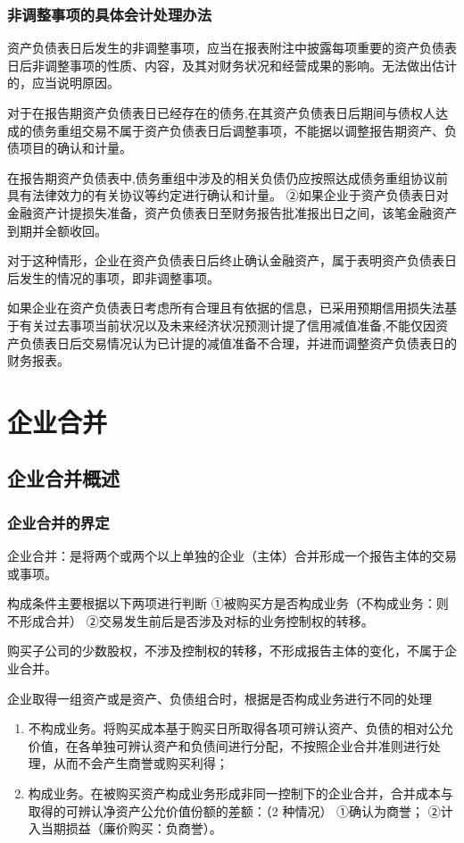\documentclass[UTF8,12pt]{ctexart}
\numberwithin{equation}{section} %
\numberwithin{figure}{section}
\numberwithin{table}{section}
\begin{document}
	
	\subsubsection{非调整事项的具体会计处理办法}
	资产负债表日后发生的非调整事项，应当在报表附注中披露每项重要的资产负债表日后非调整事项的性质、内容，及其对财务状况和经营成果的影响。无法做出估计的，应当说明原因。
	
	对于在报告期资产负债表日已经存在的债务,在其资产负债表日后期间与债权人达成的债务重组交易不属于资产负债表日后调整事项，不能据以调整报告期资产、负债项目的确认和计量。
	
	在报告期资产负债表中,债务重组中涉及的相关负债仍应按照达成债务重组协议前具有法律效力的有关协议等约定进行确认和计量。
	②如果企业于资产负债表日对金融资产计提损失准备，资产负债表日至财务报告批准报出日之间，该笔金融资产到期并全额收回。
	
	对于这种情形，企业在资产负债表日后终止确认金融资产，属于表明资产负债表日后发生的情况的事项，即非调整事项。
	
	如果企业在资产负债表日考虑所有合理且有依据的信息，已采用预期信用损失法基于有关过去事项当前状况以及未来经济状况预测计提了信用减值准备,不能仅因资产负债表日后交易情况认为已计提的减值准备不合理，并进而调整资产负债表日的财务报表。
	\newpage
	
	\section{企业合并}
	\subsection{企业合并概述}
	\subsubsection{企业合并的界定}
	企业合并：是将两个或两个以上单独的企业（主体）合并形成一个报告主体的交易或事项。
	
	构成条件主要根据以下两项进行判断
	①被购买方是否构成业务（不构成业务：则不形成合并）
	②交易发生前后是否涉及对标的业务控制权的转移。
	
	购买子公司的少数股权，不涉及控制权的转移，不形成报告主体的变化，不属于企业合并。
	
	企业取得一组资产或是资产、负债组合时，根据是否构成业务进行不同的处理
	\begin{enumerate}
		\item 不构成业务。将购买成本基于购买日所取得各项可辨认资产、负债的相对公允价值，在各单独可辨认资产和负债间进行分配，不按照企业合并准则进行处理，从而不会产生商誉或购买利得；
		
		\item 构成业务。在被购买资产构成业务形成非同一控制下的企业合并，合并成本与取得的可辨认净资产公允价值份额的差额：（2 种情况）
		①确认为商誉；
		②计入当期损益（廉价购买：负商誉）。
	\end{enumerate}
	
\end{document}
